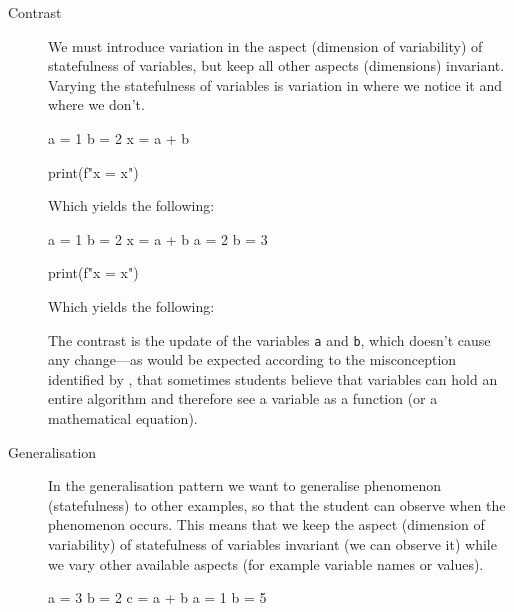 \begin{description}
  \item [Contrast] We must introduce variation in the aspect (dimension of 
    variability) of statefulness of variables, but keep all other aspects 
    (dimensions) invariant.
    Varying the statefulness of variables is variation in where we notice it 
    and where we don't.

    \begin{minipage}[t]{0.45\columnwidth}
      \begin{pyblock}[varstateC1]
a = 1
b = 2
x = a + b



print(f"x = {x}")
      \end{pyblock}

      \vspace{0.5em}
      Which yields the following:
      \printpythontex[verbatim]
    \end{minipage}
    \hfill
    \begin{minipage}[t]{0.45\columnwidth}
      \begin{pyblock}[varstateC2][highlightlines={4-5}]
a = 1
b = 2
x = a + b
a = 2
b = 3

print(f"x = {x}")
      \end{pyblock}

      \vspace{0.5em}
      Which yields the following:
      \printpythontex[verbatim]
    \end{minipage}

    The contrast is the update of the variables \texttt{a} and 
    \texttt{b}, which doesn't cause any change---as would be 
    expected according to the misconception identified by
    \textcite{Kohn2017VariableEvaluation,Plass2015Variables,Doukakis2007}, that 
    sometimes students believe that variables can hold an entire algorithm and 
    therefore see a variable as a function (or a mathematical equation).

    \item [Generalisation] In the generalisation pattern we want to generalise 
      phenomenon (statefulness) to other examples, so that the student can 
      observe when the phenomenon occurs.
      This means that we keep the aspect (dimension of variability) of 
      statefulness of variables invariant (we can observe it) while we vary 
      other available aspects (for example variable names or values).
    
      \begin{minipage}[t]{0.45\columnwidth}
        \begin{pyblock}[varstateG1]
a = 3
b = 2
c = a + b
a = 1
b = 5


\end{pyblock}
\end{minipage}
\end{description}
